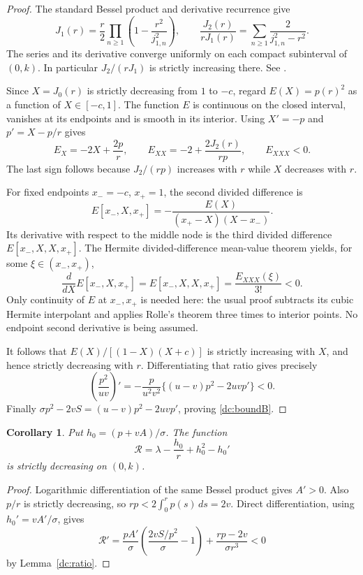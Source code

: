 \documentclass[11pt]{article}
\newtheorem{corollary}[theorem]{Corollary}
\theoremstyle{remark}
\begin{document}
\begin{proof}
The standard Bessel product and derivative recurrence give
\[
 J_1(r)=\frac r2\prod_{n\ge1}
                  \left(1-\frac{r^2}{j_{1,n}^2}\right),\qquad
 \frac{J_2(r)}{rJ_1(r)}
       =\sum_{n\ge1}\frac2{j_{1,n}^2-r^2}.
\]
The series and its derivative converge uniformly on each compact
subinterval of $(0,k)$.  In particular $J_2/(rJ_1)$ is strictly
increasing there.  See \cite[Eqs.~10.21.15 and 10.6.2]{DLMF}.

Since $X=J_0(r)$ is strictly decreasing from $1$ to $-c$, regard
$E(X)=p(r)^2$ as a function of $X\in[-c,1]$.  The function $E$ is
continuous on the closed interval, vanishes at its endpoints and
is smooth in its interior.  Using $X'=-p$ and
$p'=X-p/r$ gives
\[
 E_X=-2X+\frac{2p}r,\qquad
 E_{XX}=-2+\frac{2J_2(r)}{rp},\qquad E_{XXX}<0.
\]
The last sign follows because $J_2/(rp)$ increases with $r$ while
$X$ decreases with $r$.

For fixed endpoints $x_-=-c$, $x_+=1$, the second divided difference is
\[
 E[x_-,X,x_+]=-\frac{E(X)}{(x_+-X)(X-x_-)}.
\]
Its derivative with respect to the middle node is the third divided
difference $E[x_-,X,X,x_+]$.  The Hermite divided-difference mean-value
theorem yields, for some $\xi\in(x_-,x_+)$,
\[
 \frac{d}{dX}E[x_-,X,x_+]=E[x_-,X,X,x_+]
                   =\frac{E_{XXX}(\xi)}{3!}<0.
\]
Only continuity of $E$ at $x_-,x_+$ is needed here: the usual proof
subtracts its cubic Hermite interpolant and applies Rolle's theorem
three times to interior points.  No endpoint second derivative is
being assumed.

It follows that $E(X)/[(1-X)(X+c)]$ is strictly increasing with
$X$, and hence strictly decreasing with $r$.  Differentiating that
ratio gives precisely
\[
 \left(\frac{p^2}{uv}\right)'
 =-\frac{p}{u^2v^2}\{(u-v)p^2-2uvp'\}<0.
\]
Finally $\sigma p^2-2vS=(u-v)p^2-2uvp'$, proving
\eqref{dc:boundB}.
\end{proof}

\begin{corollary}
Put $h_0=(p+vA)/\sigma$. The function
\[
 \mathcal R=\lambda-\frac{h_0}{r}+h_0^2-h_0'
\]
is strictly decreasing on $(0,k)$.
\end{corollary}
\begin{proof}
Logarithmic differentiation of the same Bessel product gives
$A'>0$.  Also $p/r$ is strictly decreasing, so
$rp<2\int_0^rp(s)\,ds=2v$.  Direct differentiation, using
$h_0'=vA'/\sigma$, gives
\[
 \mathcal R'
 =\frac{pA'}{\sigma}\left(\frac{2vS/p^2}{\sigma}-1\right)
                      +\frac{rp-2v}{\sigma r^3}<0
\]
by Lemma~\ref{dc:ratio}.
\end{proof}
\end{document}
